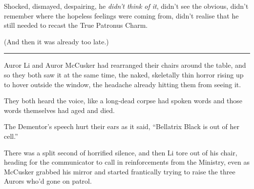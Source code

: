 Shocked, dismayed, despairing, he \emph{didn't think of it}, didn't see
the obvious, didn't remember where the hopeless feelings were coming
from, didn't realise that he still needed to recast the True Patronus
Charm.

(And then it was already too late.)

\begin{center}\rule{3in}{0.4pt}\end{center}

Auror Li and Auror McCusker had rearranged their chairs around the
table, and so they both saw it at the same time, the naked, skeletally
thin horror rising up to hover outside the window, the headache already
hitting them from seeing it.

They both heard the voice, like a long-dead corpse had spoken words and
those words themselves had aged and died.

The Dementor's speech hurt their ears as it said, ``Bellatrix Black is
out of her cell.''

There was a split second of horrified silence, and then Li tore out of
his chair, heading for the communicator to call in reinforcements from
the Ministry, even as McCusker grabbed his mirror and started
frantically trying to raise the three Aurors who'd gone on patrol.
